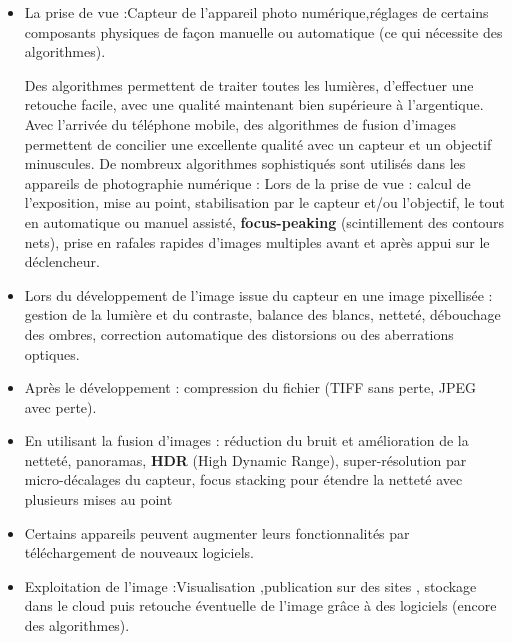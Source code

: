 \documentclass[10pt,fleqn]{article} %
\begin{document}
\begin{tcolorbox}[width=16cm,enhanced,colback=lightgray!5!white,colframe=blue,
	attach boxed title to top left=
	{yshift=-\tcboxedtitleheight/2},
	boxed title style={size=small,colback=black}]

\vspace{0.3cm}
\begin{itemize}
	\item La prise de vue :Capteur de l'appareil photo numérique,réglages de certains composants physiques de façon manuelle ou automatique  (ce qui nécessite des algorithmes).
	
	Des algorithmes permettent de traiter toutes les lumières, d’effectuer une retouche facile,
	avec une qualité maintenant bien supérieure à l’argentique. Avec l’arrivée du téléphone
	mobile, des algorithmes de fusion d’images permettent de concilier une excellente qualité
	avec un capteur et un objectif minuscules.
	De nombreux algorithmes sophistiqués sont utilisés dans les appareils de photographie
	numérique :
    Lors de la prise de vue : calcul de l’exposition, mise au point, stabilisation par le
	capteur et/ou l’objectif, le tout en automatique ou manuel assisté, \textbf{focus-peaking}
	(scintillement des contours nets), prise en rafales rapides d’images multiples avant et
	après appui sur le déclencheur.
    \item Lors du développement de l’image issue du capteur en une image pixellisée : gestion
	de la lumière et du contraste, balance des blancs, netteté, débouchage des ombres,
	correction automatique des distorsions ou des aberrations optiques.
    \item  Après le développement : compression du fichier (TIFF sans perte, JPEG avec
	perte).
    \item En utilisant la fusion d’images : réduction du bruit et amélioration de la netteté,
	panoramas,\textbf{ HDR} (High Dynamic Range), super-résolution par micro-décalages du
	capteur, focus stacking pour étendre la netteté avec plusieurs mises au point
    \item Certains appareils peuvent augmenter leurs fonctionnalités par téléchargement de
	nouveaux logiciels.
	
	\item Exploitation de l'image :Visualisation ,publication sur des sites , stockage dans le cloud puis retouche éventuelle de l'image grâce à des logiciels (encore des algorithmes).
\end{itemize}

\vspace{0.3cm}
\end{tcolorbox}
\end{document}
